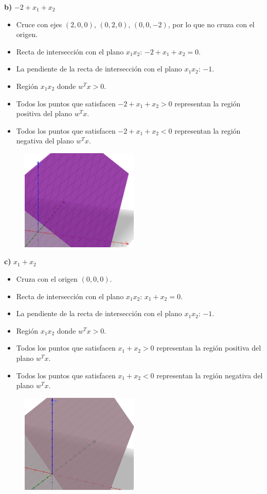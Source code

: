 \documentclass{article}
\begin{document}
\textbf{b) } $-2 + x_1 + x_2$  
\begin{itemize}
    \item Cruce con ejes $(2, 0, 0)$, $(0, 2, 0)$, $(0, 0, -2)$, por lo que no cruza con el origen.
    \item Recta de intersección con el plano $x_1x_2$: $-2 + x_1 + x_2 = 0$.
    \item La pendiente de la recta de intersección con el plano $x_1x_2$: $-1$.
    \item Región $x_1x_2$ donde $w^T x > 0$.
    \item Todos los puntos que satisfacen $-2 + x_1 + x_2 > 0$ representan la región positiva del plano $w^T x$.
    \item Todos los puntos que satisfacen $-2 + x_1 + x_2 < 0$ representan la región negativa del plano $w^T x$.
\end{itemize}
\begin{figure}[H]
    \centering
    \includegraphics[width=0.5\textwidth]{Imagen2.png}  %
\end{figure}
\textbf{c) } $x_1 + x_2$  
\begin{itemize}
    \item Cruza con el origen $(0, 0, 0)$.
    \item Recta de intersección con el plano $x_1x_2$: $x_1 + x_2 = 0$.
    \item La pendiente de la recta de intersección con el plano $x_1x_2$: $-1$.
    \item Región $x_1x_2$ donde $w^T x > 0$.
    \item Todos los puntos que satisfacen $x_1 + x_2 > 0$ representan la región positiva del plano $w^T x$.
    \item Todos los puntos que satisfacen $x_1 + x_2 < 0$ representan la región negativa del plano $w^T x$.
\end{itemize}
\begin{figure}[H]
    \centering
    \includegraphics[width=0.5\textwidth]{Imagen3.png}  %
\end{figure}
\end{document}
